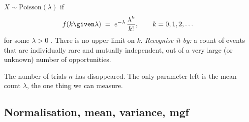 \begin{workdef}
$X\sim\mathrm{Poisson}(\lambda)$ if
\begin{equation}
  f(k\given\lambda)\;=\;e^{-\lambda}\,\frac{\lambda^k}{k!},\qquad k=0,1,2,\dots \label{2a:eq:pois}
\end{equation}
for some $\lambda>0$ . There is no upper limit on $k$.
\emph{Recognise it by:} a count of events that are individually rare and mutually independent, out of a very large (or unknown) number of opportunities.
\end{workdef}

The number of trials $n$ has disappeared. The only parameter left is the mean count $\lambda$, the one thing we can measure.

\subsection{Normalisation, mean, variance, mgf}

